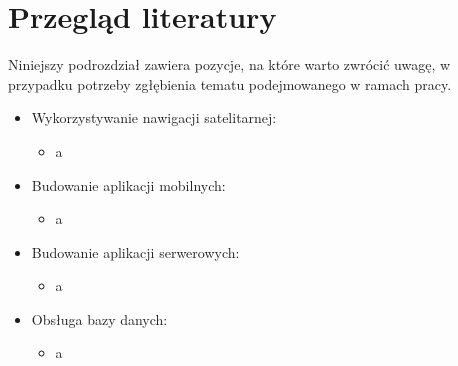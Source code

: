 \section{Przegląd literatury}
Niniejszy podrozdział zawiera pozycje, na które warto zwrócić uwagę, w przypadku potrzeby zgłębienia tematu podejmowanego w ramach pracy.
\begin{itemize}
\item{Wykorzystywanie nawigacji satelitarnej:}
\begin{itemize}
\item{a}
\end{itemize}
\item{Budowanie aplikacji mobilnych:}
\begin{itemize}
\item{a}
\end{itemize}
\item{Budowanie aplikacji serwerowych:}
\begin{itemize}
\item{a}
\end{itemize}
\item{Obsługa bazy danych:}
\begin{itemize}
\item{a}
\end{itemize}
\end{itemize}

